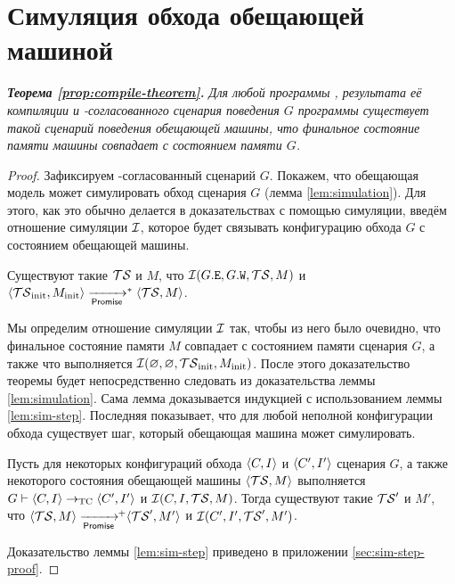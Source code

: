 \section{Симуляция обхода обещающей машиной}
\label{sec:simulation} 
\noindent
\emph{{\bf Теорема \ref {prop:compile-theorem}.}
  Для любой программы \Prog, результата её компиляции \ProgARM и \ARM-согласованного
  сценария поведения $G$ программы
  \ProgARM существует такой сценарий поведения обещающей машины, что 
  финальное состояние памяти машины совпадает с состоянием памяти $G$.
}
\begin{proof}
  Зафиксируем \ARM-согласованный сценарий $G$.
Покажем, что обещающая модель может симулировать
  обход сценария $G$ (лемма \ref{lem:simulation}).
 Для этого, как это обычно делается в доказательствах с помощью симуляции, введём
  отношение симуляции $\mathcal{I}$, которое будет связывать конфигурацию обхода $G$ с состоянием обещающей машины.
  
\begin{lemma}
  \label{lem:simulation}
  Существуют такие $\mathcal{TS}$ и $M$, что $\mathcal{I}(G.{\mathtt{E}}, G.{\mathtt{W}}, \mathcal{TS}, M)$ и
  $\tup{\TSf_{\rm init}, M_{\rm init}} \stepp^{*} \tup{\TSf, M}$.
\end{lemma}
  Мы определим отношение симуляции $\mathcal{I}$ так, чтобы из него было очевидно, что финальное состояние памяти
  $M$ совпадает с состоянием памяти сценария $G$, а также что выполняется $\mathcal{I}(\varnothing, \varnothing, \mathcal{TS}_{\rm init}, M_{\rm init})$.
   После этого доказательство теоремы будет непосредственно следовать из доказательства леммы \ref{lem:simulation}.
Сама лемма доказывается индукцией с использованием леммы \ref{lem:sim-step}. Последняя показывает,
  что для любой неполной конфигурации обхода существует шаг, который обещающая машина может симулировать. 
\begin{lemma}
  \label{lem:sim-step}
  Пусть для некоторых конфигураций обхода ${\langle{C, I}\rangle}$ и ${\langle{C', I'}\rangle}$ сценария $G$,
  а также некоторого состояния обещающей машины ${\langle{\ensuremath{\mathcal{TS}}, M}\rangle}$ выполняется
  $G \vdash {\langle{C, I}\rangle} \rightarrow_{\rm TC} {\langle{C', I'}\rangle}$ и
  $\mathcal{I}(C, I, \mathcal{TS}, M)$.
  Тогда существуют такие $\mathcal{TS}'$ и $M'$, что $\tup{\TSf, M} \stepp\!\!^{+} \tup{\TSf', M'}$ и
  $\mathcal{I}(C', I', \mathcal{TS}', M')$.
\end{lemma}
\noindent Доказательство леммы \ref{lem:sim-step} приведено в приложении \ref{sec:sim-step-proof}.
\end{proof}
  
